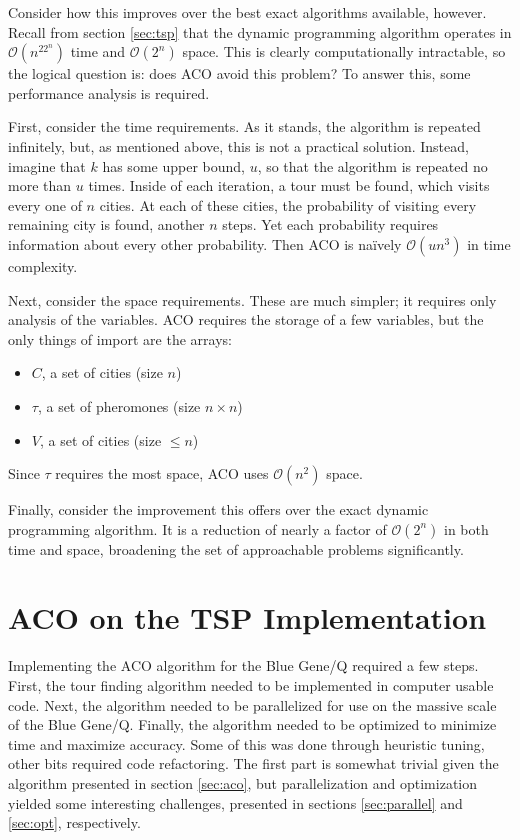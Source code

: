 \documentclass[twocolumn]{article}
\begin{document}
Consider how this improves over the best exact algorithms available, however. 
Recall from section
\ref{sec:tsp} that the dynamic programming algorithm operates in $\mathcal{O}(n^22^n)$ time
and $\mathcal{O}(2^n)$ space. This is clearly computationally intractable, so the logical
question is: does ACO avoid this problem? To answer this, some performance analysis is 
required. 

First, consider the time requirements. As it stands, the algorithm is repeated 
infinitely, but, as mentioned above, 
this is not a practical solution. Instead, imagine that $k$ has some upper 
bound, $u$, so that the algorithm is repeated no more than $u$ times. Inside of each iteration, 
a tour must be found, which visits every one of $n$ cities. At each of these cities, 
the probability of visiting every remaining city is found, another $n$ steps. Yet each 
probability requires information about every other probability. Then ACO is na\"{i}vely
$\mathcal{O}(un^3)$ in time complexity. 

Next, consider the space requirements. These are much simpler; it requires only analysis 
of the variables. ACO requires the storage of a few variables, but the only things of 
import are the arrays:
\begin{itemize}
\item $C$, a set of cities (size $n$)
\item $\tau$, a set of pheromones (size $n\times n$)
\item $V$, a set of cities (size $\leq n$)
\end{itemize}
Since $\tau$ requires the most space, ACO uses $\mathcal{O}(n^2)$ space. 

Finally, consider the improvement this offers over the exact dynamic programming 
algorithm. It is a reduction of nearly a factor of $\mathcal{O}(2^n)$ in both time
and space, broadening the set of approachable problems significantly. 

\section{ACO on the TSP Implementation} \label{sub:acoimpl}

Implementing the ACO algorithm for the Blue Gene/Q required a few steps. First,
the tour finding algorithm needed to be implemented in computer usable code. 
Next, the algorithm needed to be parallelized for use on the massive scale of
the Blue Gene/Q. Finally, the algorithm needed to be optimized to minimize 
time and maximize accuracy. Some of this was done through heuristic tuning,
other bits required code refactoring. The first part is somewhat trivial
given the algorithm presented in section \ref{sec:aco}, but parallelization
and optimization yielded some interesting challenges, presented in sections
\ref{sec:parallel} and \ref{sec:opt}, respectively. 
\end{document}

